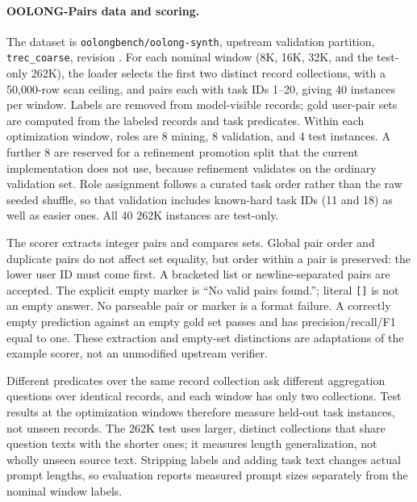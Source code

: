 \paragraph{OOLONG-Pairs data and scoring.}
The dataset is \texttt{oolongbench/oolong-synth}, upstream validation partition,
\texttt{trec\_coarse}, revision
. For each nominal window (8K,
16K, 32K, and the test-only 262K), the loader selects the first two distinct
record collections, with a 50,000-row scan ceiling, and pairs each with task
IDs 1--20, giving 40 instances per window. Labels are removed from
model-visible records; gold user-pair sets are computed from the labeled
records and task predicates. Within each optimization window, roles are 8
mining, 8 validation, and 4 test instances. A further 8 are reserved for a
refinement promotion split that the current implementation does not use,
because refinement validates on the ordinary validation set. Role assignment
follows a curated task order rather than the raw seeded shuffle, so that
validation includes known-hard task IDs (11 and 18) as well as easier ones. All
40 262K instances are test-only.

The scorer extracts integer pairs and compares sets. Global pair order and
duplicate pairs do not affect set equality, but order within a pair is preserved:
the lower user ID must come first. A bracketed list or newline-separated pairs
are accepted. The explicit empty marker is ``No valid pairs found.''; literal
\texttt{[]} is not an empty answer. No parseable pair or marker is a format
failure. A correctly empty prediction against an empty gold set passes and has
precision/recall/F1 equal to one. These extraction and empty-set distinctions
are adaptations of the example scorer, not an unmodified upstream verifier.

Different predicates over the same record collection ask different aggregation
questions over identical records, and each window has only two collections. Test
results at the optimization windows therefore measure held-out task instances,
not unseen records. The 262K test uses larger, distinct collections that share
question texts with the shorter ones; it measures length generalization, not
wholly unseen source text. Stripping labels and adding task text changes actual
prompt lengths, so evaluation reports measured prompt sizes separately from the
nominal window labels.

